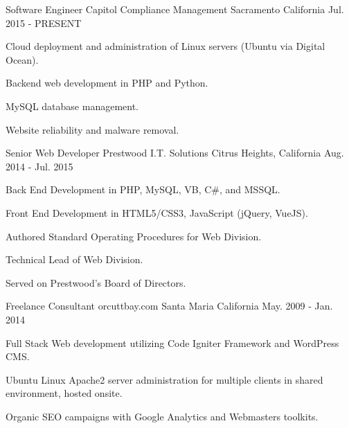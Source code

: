 

\begin{cventries}

  \cventry
    {Software Engineer} %
    {Capitol Compliance Management} %
    {Sacramento California} %
    {Jul. 2015 - PRESENT} %
    {
      \begin{cvitems} %
        \item {Cloud deployment and administration of Linux servers (Ubuntu via Digital Ocean).}
        \item {Backend web development in PHP and Python.}
        \item {MySQL database management.}
        \item {Website reliability and malware removal.}
      \end{cvitems}
    }


  \cventry
    {Senior Web Developer} %
    {Prestwood I.T. Solutions} %
    {Citrus Heights, California} %
    {Aug. 2014 - Jul. 2015} %
    {
      \begin{cvitems} %
        \item {Back End Development in PHP, MySQL, VB, C\#, and MSSQL.}
        \item {Front End Development in HTML5/CSS3, JavaScript (jQuery, VueJS). }
        \item {Authored Standard Operating Procedures for Web Division.}
        \item {Technical Lead of Web Division.}
        \item {Served on Prestwood's Board of Directors.}
      \end{cvitems}
    }

  \cventry
    {Freelance Consultant} %
    {orcuttbay.com} %
    {Santa Maria California} %
    {May. 2009 - Jan. 2014} %
    {
      \begin{cvitems} %
        \item {Full Stack Web development utilizing Code Igniter Framework and WordPress CMS.}
        \item {Ubuntu Linux Apache2 server administration for multiple clients in shared environment, hosted onsite. }
        \item {Organic SEO campaigns with Google Analytics and Webmasters toolkits.}
      \end{cvitems}
    }


\end{cventries}
